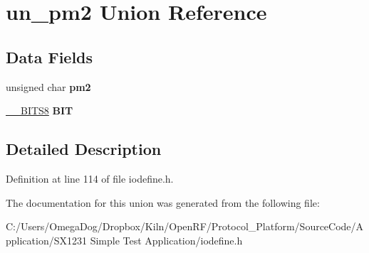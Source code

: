 \hypertarget{unionun__pm2}{\section{un\-\_\-pm2 Union Reference}
\label{unionun__pm2}
}
\subsection*{Data Fields}
\begin{DoxyCompactItemize}
\item 
\hypertarget{unionun__pm2_acfa5de3984a0c05575c0467ed851bad6}{unsigned char {\bfseries pm2}}\label{unionun__pm2_acfa5de3984a0c05575c0467ed851bad6}

\item 
\hypertarget{unionun__pm2_afb516758756851407b3b70082347c083}{\hyperlink{struct_____b_i_t_s8}{\-\_\-\-\_\-\-B\-I\-T\-S8} {\bfseries B\-I\-T}}\label{unionun__pm2_afb516758756851407b3b70082347c083}

\end{DoxyCompactItemize}


\subsection{Detailed Description}


Definition at line 114 of file iodefine.\-h.



The documentation for this union was generated from the following file\-:\begin{DoxyCompactItemize}
\item 
C\-:/\-Users/\-Omega\-Dog/\-Dropbox/\-Kiln/\-Open\-R\-F/\-Protocol\-\_\-\-Platform/\-Source\-Code/\-Application/\-S\-X1231 Simple Test Application/iodefine.\-h\end{DoxyCompactItemize}
